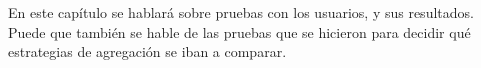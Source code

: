 En este capítulo se hablará sobre pruebas con los usuarios, y sus resultados. Puede que también
se hable de las pruebas que se hicieron para decidir qué estrategias de
agregación se iban a comparar.
